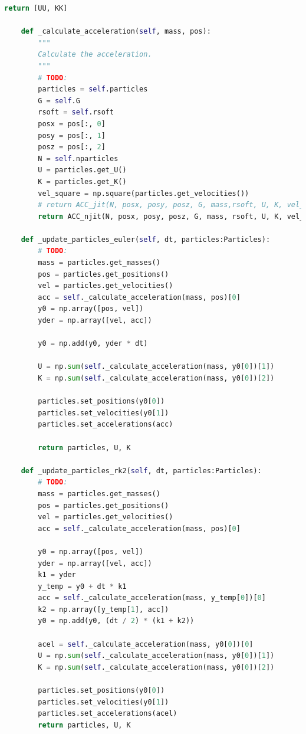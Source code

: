 \documentclass[12pt]{article}
\begin{document}
\begin{lstlisting}[language={Python}]
        return [UU, KK]

    def _calculate_acceleration(self, mass, pos):
        """
        Calculate the acceleration.
        """
        # TODO:
        particles = self.particles
        G = self.G
        rsoft = self.rsoft
        posx = pos[:, 0]
        posy = pos[:, 1]
        posz = pos[:, 2]
        N = self.nparticles
        U = particles.get_U()
        K = particles.get_K()
        vel_square = np.square(particles.get_velocities())
        # return ACC_jit(N, posx, posy, posz, G, mass,rsoft, U, K, vel_square)
        return ACC_njit(N, posx, posy, posz, G, mass, rsoft, U, K, vel_square)

    def _update_particles_euler(self, dt, particles:Particles):
        # TODO:
        mass = particles.get_masses()
        pos = particles.get_positions()
        vel = particles.get_velocities()
        acc = self._calculate_acceleration(mass, pos)[0]
        y0 = np.array([pos, vel])
        yder = np.array([vel, acc])
        
        y0 = np.add(y0, yder * dt)
        
        U = np.sum(self._calculate_acceleration(mass, y0[0])[1])
        K = np.sum(self._calculate_acceleration(mass, y0[0])[2])
        
        particles.set_positions(y0[0])
        particles.set_velocities(y0[1])
        particles.set_accelerations(acc)
        
        return particles, U, K

    def _update_particles_rk2(self, dt, particles:Particles):
        # TODO:
        mass = particles.get_masses()
        pos = particles.get_positions()
        vel = particles.get_velocities()
        acc = self._calculate_acceleration(mass, pos)[0]
        
        y0 = np.array([pos, vel])
        yder = np.array([vel, acc])
        k1 = yder
        y_temp = y0 + dt * k1 
        acc = self._calculate_acceleration(mass, y_temp[0])[0]
        k2 = np.array([y_temp[1], acc])
        y0 = np.add(y0, (dt / 2) * (k1 + k2))
        
        acel = self._calculate_acceleration(mass, y0[0])[0]
        U = np.sum(self._calculate_acceleration(mass, y0[0])[1])
        K = np.sum(self._calculate_acceleration(mass, y0[0])[2])
        
        particles.set_positions(y0[0])
        particles.set_velocities(y0[1])
        particles.set_accelerations(acel)
        return particles, U, K


\end{lstlisting}
\end{document}
